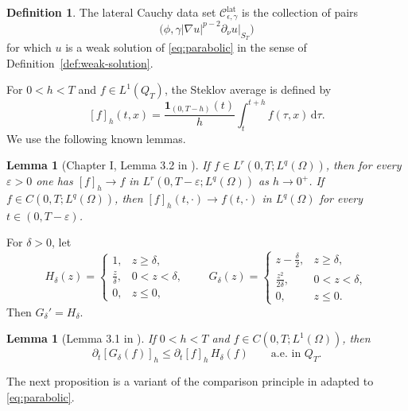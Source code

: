 \documentclass[a4paper,12pt]{article}
\newcommand{\pr}{\partial}
\newcommand{\dd}{\,\mathrm{d}}
\newtheorem{lem}[thm]{Lemma}
\theoremstyle{definition}
\newtheorem{dfn}[thm]{Definition}
\theoremstyle{remark}
\begin{document}
\begin{dfn}\label{def:lateral-cauchy}
The lateral Cauchy data set $\mathcal C^{\mathrm{lat}}_{\epsilon,\gamma}$ is the collection of pairs
\[
\bigl(\phi,\gamma|\nabla u|^{p-2}\pr_\nu u|_{S_T}\bigr)
\]
for which $u$ is a weak solution of \eqref{eq:parabolic} in the sense of Definition~\ref{def:weak-solution}.
\end{dfn}

For $0<h<T$ and $f\in L^1(Q_T)$, the Steklov average is defined by
\[
[f]_h(t,x)=\frac{\mathbf{1}_{(0,T-h)}(t)}{h}\int_t^{t+h}f(\tau,x)\dd\tau.
\]
We use the following known lemmas.

\begin{lem}[Chapter I, Lemma 3.2 in \cite{DiB}]\label{lem:dibenedetto}
If $f\in L^r(0,T;L^q(\Omega))$, then for every $\varepsilon>0$ one has $[f]_h\to f$ in $L^r(0,T-\varepsilon;L^q(\Omega))$ as $h\to0^+$. If $f\in C(0,T;L^q(\Omega))$, then $[f]_h(t,\cdot)\to f(t,\cdot)$ in $L^q(\Omega)$ for every $t\in(0,T-\varepsilon)$.
\end{lem}

For $\delta>0$, let
\[
H_\delta(z)=
\begin{cases}
1,& z\ge \delta,\\
\frac{z}{\delta},&0<z<\delta,\\
0,& z\le 0,
\end{cases}
\qquad
G_\delta(z)=
\begin{cases}
z-\frac{\delta}{2},& z\ge \delta,\\
\frac{z^2}{2\delta},&0<z<\delta,\\
0,& z\le 0.
\end{cases}
\]
Then $G_\delta'=H_\delta$.

\begin{lem}[Lemma 3.1 in \cite{BoStru}]\label{lem:Steklov-positive}
If $0<h<T$ and $f\in C(0,T;L^1(\Omega))$, then
\[
\pr_t[G_\delta(f)]_h\le \pr_t[f]_h\,H_\delta(f)
\qquad\text{a.e. in }Q_T.
\]
\end{lem}

The next proposition is a variant of the comparison principle in \cite{BoStru} adapted to \eqref{eq:parabolic}.
\end{document}
